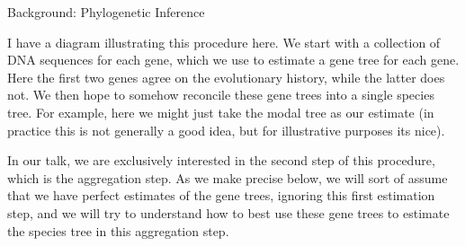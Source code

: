 \documentclass[11pt,aspectratio=169]{beamer}
\begin{document}
\begin{frame}{Background: Phylogenetic Inference}
{  \vspace{0.5em}

  I have a diagram illustrating this procedure here. We start with a collection of DNA sequences for each gene, which we use to estimate a gene tree for each gene. Here the first two genes agree on the evolutionary history, while the latter does not. 
  We then hope to somehow reconcile these gene trees into a single species tree. For example, here we might just take the modal tree as our estimate (in practice this is not generally a good idea, but for illustrative purposes its nice).

  \vspace{0.5em}
  In our talk, we are exclusively interested in the second step of this procedure, which is the aggregation step. 
  As we make precise below, we will sort of assume that we have perfect estimates of the gene trees, ignoring this first estimation step, and we will try to understand how to best use these gene trees to estimate the species tree
  in this aggregation step.
}


\end{frame}
\end{document}
